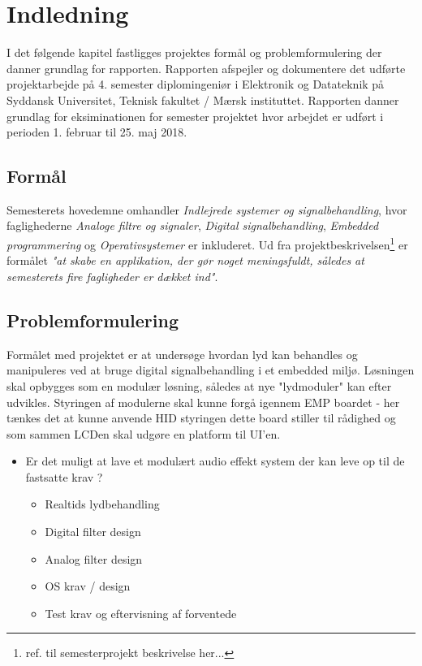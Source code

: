 \chapter{Indledning}
\vspace*{0.5 cm}
I det følgende kapitel fastligges projektes formål og problemformulering der danner grundlag for rapporten.
Rapporten afspejler og dokumentere det udførte projektarbejde på 4. semester diplomingeniør i Elektronik og Datateknik på Syddansk Universitet, Teknisk fakultet / Mærsk instituttet.
Rapporten danner grundlag for eksiminationen for semester projektet hvor arbejdet er udført i perioden 1. februar til 25. maj 2018.


\section{Formål}
Semesterets hovedemne omhandler \emph{Indlejrede systemer og signalbehandling}, hvor faglighederne \emph{Analoge filtre og signaler}, \emph{Digital signalbehandling}, \emph{Embedded programmering} og \emph{Operativsystemer} er inkluderet.
Ud fra projektbeskrivelsen\footnote{ref. til  semesterprojekt beskrivelse her...} er formålet\textit{ "at skabe en applikation, der gør noget meningsfuldt, således at semesterets fire fagligheder er dækket ind"}.


\section{Problemformulering}
Formålet med projektet er at undersøge hvordan lyd kan behandles og manipuleres ved at bruge digital signalbehandling i et embedded miljø.
Løsningen skal opbygges som en modulær løsning, således at nye "lydmoduler" kan efter udvikles.
Styringen af modulerne skal kunne forgå igennem EMP boardet - her tænkes det at kunne anvende HID styringen dette board stiller til rådighed og som sammen LCDen skal udgøre en platform til UI'en. 



\begin{itemize}
	\item Er det muligt at lave et modulært audio effekt system der kan leve op til de fastsatte krav ? 

	\begin{itemize}
		
		\item Realtids lydbehandling 
		\item Digital filter design
		\item Analog filter design
		\item OS krav / design
		\item Test krav og eftervisning af forventede
	\end{itemize}
\end{itemize}

